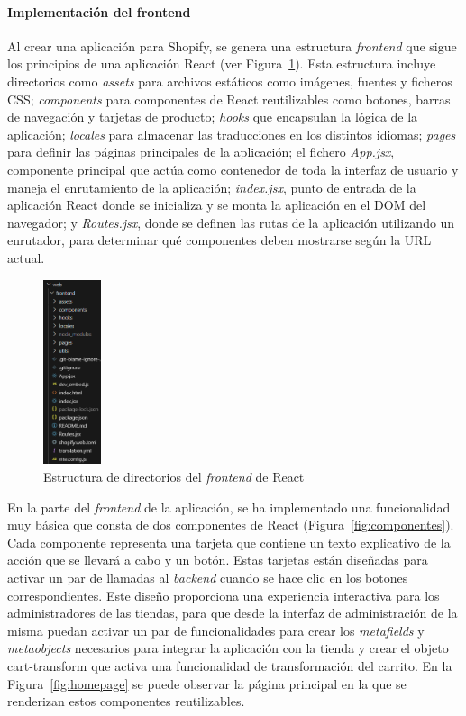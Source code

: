 \documentclass[11pt]{article}
\newcommand{\subsubsubsection}[1]{\paragraph{#1}}
\begin{document}
\subsubsubsection{Implementación del frontend}

Al crear una aplicación para Shopify, se genera una estructura \textit{frontend} que sigue los principios de una aplicación React (ver Figura~\ref{fig:estructuraFront}). Esta estructura incluye directorios como \textit{assets} para 
archivos estáticos como imágenes, fuentes y ficheros CSS; \textit{components} para componentes de React reutilizables como botones, barras de navegación y tarjetas de producto; 
\textit{hooks} que encapsulan la lógica de la aplicación; \textit{locales} para almacenar las traducciones en los distintos idiomas; \textit{pages} para definir las páginas principales de la aplicación; el fichero \textit{App.jsx},
componente principal que actúa como contenedor de toda la interfaz de usuario y maneja el enrutamiento de la aplicación; \textit{index.jsx}, punto de entrada de la aplicación React donde
se inicializa y se monta la aplicación en el DOM del navegador; y \textit{Routes.jsx}, donde se definen las rutas de la aplicación utilizando un enrutador, para determinar qué componentes
deben mostrarse según la URL actual.

\begin{figure}[H]
    \centering
    \includegraphics[width=0.15\textwidth]{imagenes-admin/EstructuraDirectoriosReact.png}
    \caption{\label{fig:estructuraFront} Estructura de directorios del \textit{frontend} de React}
    \vspace{\fill}
\end{figure}

En la parte del \textit{frontend} de la aplicación, se ha implementado una funcionalidad muy básica que consta de dos componentes de React (Figura~\ref{fig:componentes}). Cada componente representa una tarjeta que 
contiene un texto explicativo de la acción que se llevará a cabo y un botón. Estas tarjetas están diseñadas para activar un par de llamadas al \textit{backend} cuando se hace clic en los 
botones correspondientes. Este diseño proporciona una experiencia interactiva para los administradores de las tiendas, para que desde la interfaz de administración de la misma
puedan activar un par de funcionalidades para crear los \textit{metafields} y \textit{metaobjects} necesarios para integrar la aplicación con la tienda y crear el objeto cart-transform que activa una funcionalidad
de transformación del carrito. En la Figura~\ref{fig:homepage} se puede observar la página principal en la que se renderizan estos componentes reutilizables.
\end{document}
